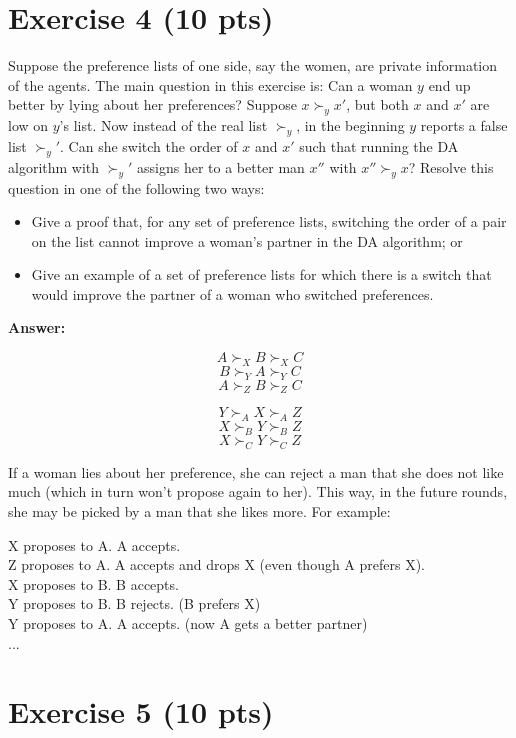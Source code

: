 \documentclass{article}
\begin{document}
\section{Exercise 4 (10 pts)}

Suppose the preference lists of one side, say the women, are private information of the agents. The main question in this exercise is: Can a woman $y$ end up better by lying about her preferences? Suppose $x \succ_y x'$, but both $x$ and $x'$ are low on $y$'s list. Now instead of the real list $\succ_y$, in the beginning $y$ reports a false list $\succ_y'$. Can she switch the order of $x$ and $x'$ such that running the DA algorithm with $\succ_y'$ assigns her to a better man $x''$ with $x'' \succ_y x$? Resolve this question in one of the following two ways:

\begin{itemize}
\item Give a proof that, for any set of preference lists, switching the order of a pair on the list cannot improve a woman's partner in the DA algorithm; or
\item Give an example of a set of preference lists for which there is a switch that would improve the partner of a woman who switched preferences.
\end{itemize}

\bigskip \noindent \textbf{Answer:}

$$A \succ_X B \succ_X C$$
$$B \succ_Y A \succ_Y C$$ 
$$A \succ_Z B \succ_Z C$$

$$Y \succ_A X \succ_A Z$$
$$X \succ_B Y \succ_B Z$$ 
$$X \succ_C Y \succ_C Z$$

If a woman lies about her preference, she can reject a man that she does not like much (which in turn won't propose again to her). This way, in the future rounds, she may be picked by a man that she likes more. For example:

\bigskip
\noindent X proposes to A. A accepts. \\
\noindent Z proposes to A. A accepts and drops X (even though A prefers X). \\
\noindent X proposes to B. B accepts. \\
\noindent Y proposes to B. B rejects. (B prefers X) \\
\noindent Y proposes to A. A accepts. (now A gets a better partner) \\
\noindent ...

\section{Exercise 5 (10 pts)}
\end{document}
